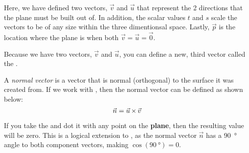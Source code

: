 Here, we have defined two vectors, $\vec{v}$ and $\vec{u}$ that represent the 2 directions that the plane must be built out of.
In addition, the scalar values $t$ and $s$ scale the vectors to be of any size within the three dimentionsal space.
Lastly, $\vec{p}$ is the location where the plane is when both $\vec{v} = \vec{u} = \vec{0}$.

Because we have two vectors, $\vec{v}$ and $\vec{u}$, you can define a new, third vector called the .

\begin{definition}\label{def:Normal_Vector}
  A \emph{normal vector} is a vector that is normal (orthogonal) to the surface it was created from.
  If we work with , then the normal vector can be defined as shown below:
  \begin{equation}\label{eq:Normal_Vector}
    \vec{n} = \vec{u} \operatorname{\times} \vec{v}
  \end{equation}

  \begin{remark}\label{rmk:Component_Vectors_Dot_Product}
    If you take the  and dot it with any point on the \textbf{plane}, then the resulting value will be zero.
    This is a logical extension to , as the normal vector $\vec{n}$ has a \SI{90}{\degree} angle to both component vectors, making $\cos(\SI{90}{\degree}) = 0$.
  \end{remark}
\end{definition}


